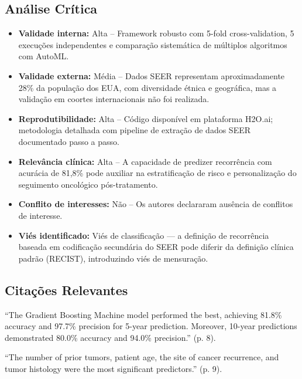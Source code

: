 \subsection{Análise Crítica}
\begin{itemize}
  \item \textbf{Validade interna:} Alta -- Framework robusto com 5-fold
        cross-validation, 5 execuções independentes e comparação
        sistemática de múltiplos algoritmos com AutoML.
  \item \textbf{Validade externa:} Média -- Dados SEER representam
        aproximadamente 28\% da população dos EUA, com diversidade
        étnica e geográfica, mas a validação em coortes internacionais
        não foi realizada.
  \item \textbf{Reprodutibilidade:} Alta -- Código disponível em
        plataforma H2O.ai; metodologia detalhada com pipeline de
        extração de dados SEER documentado passo a passo.
  \item \textbf{Relevância clínica:} Alta -- A capacidade de predizer
        recorrência com acurácia de 81,8\% pode auxiliar na
        estratificação de risco e personalização do seguimento
        oncológico pós-tratamento.
  \item \textbf{Conflito de interesses:} Não -- Os autores declararam
        ausência de conflitos de interesse.
  \item \textbf{Viés identificado:} Viés de classificação — a definição
        de recorrência baseada em codificação secundária do SEER pode
        diferir da definição clínica padrão (RECIST), introduzindo
        viés de mensuração.
\end{itemize}

\subsection{Citações Relevantes}
\begin{citacao}
``The Gradient Boosting Machine model performed the best, achieving 81.8\%
accuracy and 97.7\% precision for 5-year prediction. Moreover, 10-year
predictions demonstrated 80.0\% accuracy and 94.0\% precision.'' (p. 8).
\end{citacao}

\begin{citacao}
``The number of prior tumors, patient age, the site of cancer recurrence,
and tumor histology were the most significant predictors.'' (p. 9).
\end{citacao}

